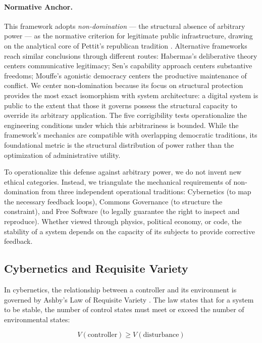 \documentclass{article}
\begin{document}
\paragraph{Normative Anchor.} This framework adopts \textit{non-domination} --- the structural absence of arbitrary power --- as the normative criterion for legitimate public infrastructure, drawing on the analytical core of Pettit's republican tradition \citep{pettit1997}. Alternative frameworks reach similar conclusions through different routes: Habermas's deliberative theory \citep{habermas1996} centers communicative legitimacy; Sen's capability approach \citep{sen1999} centers substantive freedoms; Mouffe's agonistic democracy \citep{mouffe2000} centers the productive maintenance of conflict. We center non-domination because its focus on structural protection provides the most exact isomorphism with system architecture: a digital system is public to the extent that those it governs possess the structural capacity to override its arbitrary application. The five corrigibility tests operationalize the engineering conditions under which this arbitrariness is bounded. While the framework's mechanics are compatible with overlapping democratic traditions, its foundational metric is the structural distribution of power rather than the optimization of administrative utility.

To operationalize this defense against arbitrary power, we do not invent new ethical categories. Instead, we triangulate the mechanical requirements of non-domination from three independent operational traditions: Cybernetics (to map the necessary feedback loops), Commons Governance (to structure the constraint), and Free Software (to legally guarantee the right to inspect and reproduce). Whether viewed through physics, political economy, or code, the stability of a system depends on the capacity of its subjects to provide corrective feedback.

\subsection{Cybernetics and Requisite Variety}

In cybernetics, the relationship between a controller and its environment is governed by Ashby's Law of Requisite Variety \citep{ashby1956}. The law states that for a system to be stable, the number of control states must meet or exceed the number of environmental states:

\begin{equation}
V(\text{controller}) \geq V(\text{disturbance})
\label{eq:ashby}
\end{equation}
\end{document}
